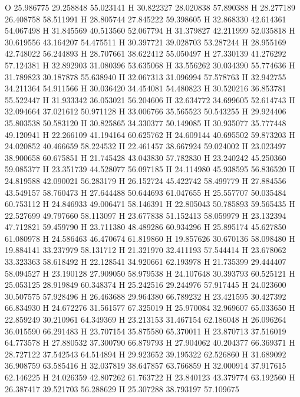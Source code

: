 \documentclass{article}
\begin{document}
O 25.986775 29.258848 55.023141 
H 30.822327 28.020838 57.890388 
H 28.277189 26.408758 58.511991 
H 28.805744 27.845222 59.398605 
H 32.868330 42.614361 54.067498 
H 31.845569 40.513560 52.067794 
H 31.379827 42.211999 52.035818 
H 30.619556 43.164207 54.475511 
H 30.397721 39.028703 53.287244 
H 28.955169 42.748022 56.244893 
H 28.707661 38.622412 55.050497 
H 27.330139 41.276292 57.124381 
H 32.892903 31.080396 53.635068 
H 33.556262 30.034390 55.774636 
H 31.789823 30.187878 55.638940 
H 32.067313 31.096994 57.578763 
H 32.942755 34.211364 54.911566 
H 30.036420 34.454081 54.480823 
H 30.520216 36.853781 55.522447 
H 31.933342 36.053021 56.204606 
H 32.634772 34.699605 52.614743 
H 32.094664 37.021612 50.971128 
H 33.006766 35.565523 50.543255 
H 29.924406 35.803538 50.583120 
H 30.825865 34.330377 50.149085 
H 30.935077 35.777448 49.120941 
H 22.266109 41.194164 60.625762 
H 24.609144 40.695502 59.873203 
H 24.020852 40.466659 58.224532 
H 22.461457 38.667924 59.024002 
H 23.023497 38.900658 60.675851 
H 21.745428 43.043830 57.782830 
H 23.240242 45.250360 59.085377 
H 23.351739 44.528077 56.097185 
H 24.114980 45.938595 56.836520 
H 24.819588 42.090021 56.283179 
H 26.152724 45.422742 58.499779 
H 27.884556 43.549157 58.760473 
H 27.644488 50.644693 61.047655 
H 25.557707 50.035484 60.753112 
H 24.846933 49.006471 58.146391 
H 22.805043 50.785893 59.565435 
H 22.527699 49.797660 58.113097 
H 23.677838 51.152413 58.059979 
H 23.132394 47.712821 59.459790 
H 23.711380 48.489286 60.934296 
H 25.895174 45.627850 61.080978 
H 24.586463 46.470674 61.819860 
H 19.857626 30.670136 58.098480 
H 19.884141 33.237979 58.131712 
H 21.321970 32.411193 57.544414 
H 23.678062 33.323363 58.618492 
H 22.128541 34.920661 62.193978 
H 21.735399 29.444407 58.094527 
H 23.190128 27.909050 58.979538 
H 24.107648 30.393793 60.525121 
H 25.053125 28.919849 60.348374 
H 25.242516 29.244976 57.917445 
H 24.023600 30.507575 57.928496 
H 26.463688 29.964380 66.789232 
H 23.421595 30.427392 66.834930 
H 24.672276 31.561577 67.325019 
H 25.970084 32.969607 65.033650 
H 22.859249 30.210961 64.349369 
H 23.213153 31.467154 62.186048 
H 26.096264 36.015590 66.291483 
H 23.707154 35.875580 65.370011 
H 23.870713 37.516019 64.773578 
H 27.880532 37.300790 66.879793 
H 27.904062 40.204377 66.369371 
H 28.727122 37.542543 64.514894 
H 29.923652 39.195322 62.526860 
H 31.689092 36.908759 63.585416 
H 32.037819 38.647857 63.766859 
H 32.000914 37.917615 62.146225 
H 24.026359 42.807262 61.763722 
H 23.840123 43.379774 63.192560 
H 26.387417 39.521703 56.288629 
H 25.307288 38.793197 57.109675 
\end{document}
